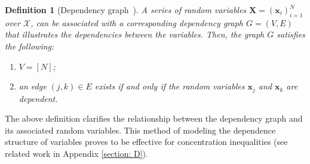 \documentclass{article}
\def\vx{{\mathbf{x}}}
\def\mX{{\mathbf{X}}}
\newtheorem{definition}{Definition}
\begin{document}
    \begin{definition}[Dependency graph~\cite{ralaivola2015entropy}] \label{def: dependency graph}
    A series of random variables $\mX = (\vx_i)_{i=1}^N$ over $\mathcal{X}$, 
    can be associated with a corresponding dependency graph $G = (V, E)$ that illustrates the dependencies between the variables. Then, the graph $G$ satisfies the following:
        \begin{enumerate}[(1)]
        \setlength\itemsep{-0.2pt}
        \vspace{-0.1in}
            \item $V = [N]$;
            \item an edge \((j, k) \in E\) exists if and only if the random variables \(\vx_j\) and \(\vx_k\) are dependent.
        \end{enumerate}
        \vspace{-0.1in}
    \end{definition}
The above definition clarifies the relationship between the dependency graph and its associated random variables. 
This method of modeling the dependence structure of variables proves to be effective for concentration inequalities (see related work in Appendix \ref{section: D}).
\end{document}
